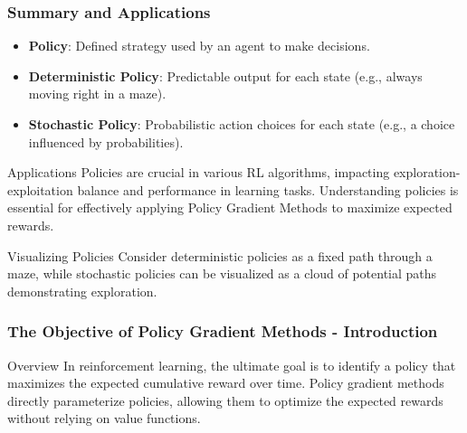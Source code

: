 \documentclass{beamer}
\begin{document}
\begin{frame}[fragile]
    \frametitle{Summary and Applications}
    \begin{itemize}
        \item \textbf{Policy}: Defined strategy used by an agent to make decisions.
        \item \textbf{Deterministic Policy}: Predictable output for each state (e.g., always moving right in a maze).
        \item \textbf{Stochastic Policy}: Probabilistic action choices for each state (e.g., a choice influenced by probabilities).
    \end{itemize}

    \begin{block}{Applications}
        Policies are crucial in various RL algorithms, impacting exploration-exploitation balance and performance in learning tasks. Understanding policies is essential for effectively applying Policy Gradient Methods to maximize expected rewards.
    \end{block}

    \begin{block}{Visualizing Policies}
        Consider deterministic policies as a fixed path through a maze, while stochastic policies can be visualized as a cloud of potential paths demonstrating exploration.
    \end{block}
\end{frame}

\begin{frame}[fragile]
    \frametitle{The Objective of Policy Gradient Methods - Introduction}
    \begin{block}{Overview}
        In reinforcement learning, the ultimate goal is to identify a policy that maximizes the expected cumulative reward over time.
        Policy gradient methods directly parameterize policies, allowing them to optimize the expected rewards without relying on value functions.
    \end{block}
\end{frame}
\end{document}

